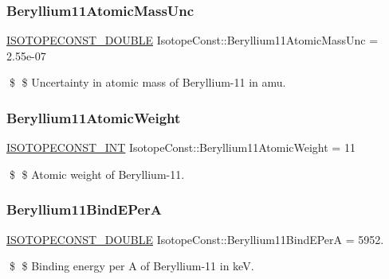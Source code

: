\subsubsection{\texorpdfstring{Beryllium11\+Atomic\+Mass\+Unc}{Beryllium11AtomicMassUnc}}
{\footnotesize\ttfamily \mbox{\hyperlink{group___isotope_const-_macros_ga8f45a7272ce02c0b4c65c44636ed719a}{I\+S\+O\+T\+O\+P\+E\+C\+O\+N\+S\+T\+\_\+\+D\+O\+U\+B\+LE}} Isotope\+Const\+::\+Beryllium11\+Atomic\+Mass\+Unc = 2.\+55e-\/07}

\$ \$ Uncertainty in atomic mass of Beryllium-\/11 in amu. \mbox{\label{group___isotope_const-_beryllium-_be11_gaaa17c98f1152f162a3418274a8cd260b}} 
\subsubsection{\texorpdfstring{Beryllium11\+Atomic\+Weight}{Beryllium11AtomicWeight}}
{\footnotesize\ttfamily \mbox{\hyperlink{group___isotope_const-_macros_ga5f18360b3e99483a35c32d789e62621c}{I\+S\+O\+T\+O\+P\+E\+C\+O\+N\+S\+T\+\_\+\+I\+NT}} Isotope\+Const\+::\+Beryllium11\+Atomic\+Weight = 11}

\$ \$ Atomic weight of Beryllium-\/11. \mbox{\label{group___isotope_const-_beryllium-_be11_ga1dfd6a245d3dd06d769de592ba29aec9}} 
\subsubsection{\texorpdfstring{Beryllium11\+Bind\+E\+PerA}{Beryllium11BindEPerA}}
{\footnotesize\ttfamily \mbox{\hyperlink{group___isotope_const-_macros_ga8f45a7272ce02c0b4c65c44636ed719a}{I\+S\+O\+T\+O\+P\+E\+C\+O\+N\+S\+T\+\_\+\+D\+O\+U\+B\+LE}} Isotope\+Const\+::\+Beryllium11\+Bind\+E\+PerA = 5952.}

\$ \$ Binding energy per A of Beryllium-\/11 in keV. \mbox{\label{group___isotope_const-_beryllium-_be11_ga3a5ff2945bc5a9a6d51c72b3d2378b05}} 
